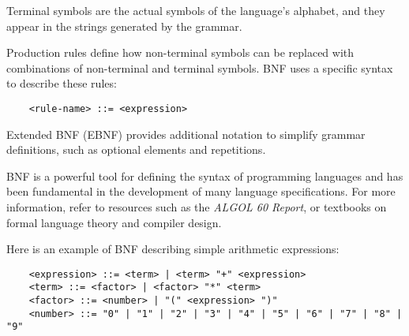 Terminal symbols are the actual symbols of the language's alphabet, and they appear in the strings generated by the grammar.

Production rules define how non-terminal symbols can be replaced with combinations of non-terminal and terminal symbols. BNF uses a specific syntax to describe these rules:

\begin{verbatim}
	<rule-name> ::= <expression>
\end{verbatim}

Extended BNF (EBNF) provides additional notation to simplify grammar definitions, such as optional elements and repetitions.

BNF is a powerful tool for defining the syntax of programming languages and has been fundamental in the development of many language specifications. For more information, refer to resources such as the \emph{ALGOL 60 Report}, or textbooks on formal language theory and compiler design.


\begin{example}
Here is an example of BNF describing simple arithmetic expressions:
\begin{verbatim}
	<expression> ::= <term> | <term> "+" <expression>
	<term> ::= <factor> | <factor> "*" <term>
	<factor> ::= <number> | "(" <expression> ")"
	<number> ::= "0" | "1" | "2" | "3" | "4" | "5" | "6" | "7" | "8" | "9"
\end{verbatim}
\end{example}



